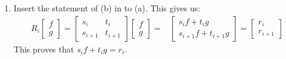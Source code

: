 \documentclass[11pt,a4paper]{article}
\begin{document}
\begin{enumerate}
\begin{enumerate}
		      \item Insert the statement of (b) in to (a). This gives us:
		            \begin{align*}
			            R_i\begin{bmatrix}
				               f \\ g
			               \end{bmatrix} =
			            \begin{bmatrix}
				            s_i       & t_i       \\
				            s_{i + 1} & t_{i + 1}
			            \end{bmatrix} \begin{bmatrix}
				                          f \\ g
			                          \end{bmatrix} = & \begin{bmatrix}
				                                            s_if + t_ig \\
				                                            s_{i + 1}f + t_{i + 1}g
			                                            \end{bmatrix} = \begin{bmatrix}
				                                                            r_i \\
				                                                            r_{i + 1}
			                                                            \end{bmatrix}
		            \end{align*}
		            This proves that $s_if + t_ig = r_i$.
	      \end{enumerate}
\end{enumerate}
\end{document}

